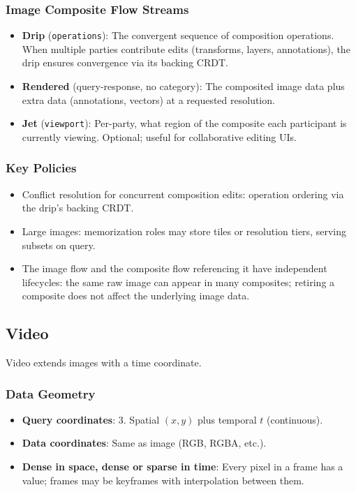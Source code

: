 \documentclass[11pt, letterpaper]{article}
\begin{document}
\subsubsection{Image Composite Flow Streams}
\begin{itemize}[leftmargin=2em]
  \item \textbf{Drip} (\texttt{operations}): The convergent sequence of composition
    operations. When multiple parties contribute edits (transforms, layers, annotations),
    the drip ensures convergence via its backing CRDT.
  \item \textbf{Rendered} (query-response, no category): The composited image data plus
    extra data (annotations, vectors) at a requested resolution.
  \item \textbf{Jet} (\texttt{viewport}): Per-party, what region of the composite each
    participant is currently viewing. Optional; useful for collaborative editing UIs.
\end{itemize}

\subsubsection{Key Policies}
\begin{itemize}[leftmargin=2em]
  \item Conflict resolution for concurrent composition edits: operation ordering via the
    drip's backing CRDT.
  \item Large images: memorization roles may store tiles or resolution tiers, serving
    subsets on query.
  \item The image flow and the composite flow referencing it have independent lifecycles:
    the same raw image can appear in many composites; retiring a composite does not affect
    the underlying image data.
\end{itemize}

\subsection{Video}
\label{sec:ex-video}

Video extends images with a time coordinate.

\subsubsection{Data Geometry}
\begin{itemize}[leftmargin=2em]
  \item \textbf{Query coordinates}: 3. Spatial $(x, y)$ plus temporal $t$ (continuous).
  \item \textbf{Data coordinates}: Same as image (RGB, RGBA, etc.).
  \item \textbf{Dense in space, dense or sparse in time}: Every pixel in a frame has
    a value; frames may be keyframes with interpolation between them.
\end{itemize}
\end{document}
